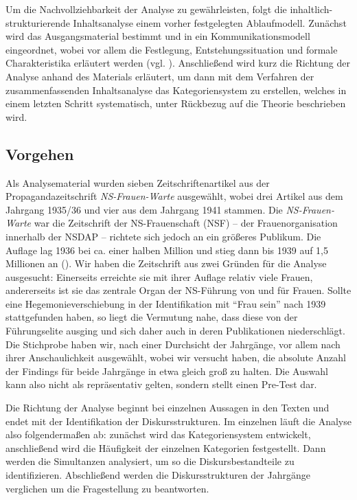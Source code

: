 \documentclass[12pt, titlepage=true, toc=bib]{scrartcl}
\begin{document}
Um die Nachvollziehbarkeit der Analyse zu gewährleisten, folgt die inhaltlich-strukturierende Inhaltsanalyse einem vorher festgelegten Ablaufmodell. Zunächst wird das Ausgangsmaterial bestimmt und in ein Kommunikationsmodell eingeordnet, wobei vor allem die Festlegung, Entstehungssituation und formale Charakteristika erläutert werden (vgl. \cite[52-53]{mayring_qualitative_2010}). Anschließend wird kurz die Richtung der Analyse anhand des Materials erläutert, um dann mit dem Verfahren der zusammenfassenden Inhaltsanalyse das Kategoriensystem zu erstellen, welches in einem letzten Schritt systematisch, unter Rückbezug auf die Theorie beschrieben wird.

\subsection{Vorgehen}

Als Analysematerial wurden sieben Zeitschriftenartikel aus der Propagandazeitschrift \textit{NS-Frauen-Warte} ausgewählt, wobei drei Artikel aus dem Jahrgang 1935/36 und vier aus dem Jahrgang 1941 stammen. Die \textit{NS-Frauen-Warte} war die Zeitschrift der NS-Frauenschaft (NSF) -- der Frauenorganisation innerhalb der NSDAP -- richtete sich jedoch an ein größeres Publikum. Die Auflage lag 1936 bei ca. einer halben Million und stieg dann bis 1939 auf 1,5 Millionen an (\cite[vgl.][89-90]{dohring_von_2004}). Wir haben die Zeitschrift aus zwei Gründen für die Analyse ausgesucht: Einerseits erreichte sie mit ihrer Auflage relativ viele Frauen, andererseits ist sie das zentrale Organ der NS-Führung von und für Frauen. Sollte eine Hegemonieverschiebung in der Identifikation mit "`Frau sein"' nach 1939 stattgefunden haben, so liegt die Vermutung nahe, dass diese von der Führungselite ausging und sich daher auch in deren Publikationen niederschlägt. Die Stichprobe haben wir, nach einer Durchsicht der Jahrgänge, vor allem nach ihrer Anschaulichkeit ausgewählt, wobei wir versucht haben, die absolute Anzahl der Findings für beide Jahrgänge in etwa gleich groß zu halten. Die Auswahl kann also nicht als repräsentativ gelten, sondern stellt einen Pre-Test dar.

Die Richtung der Analyse beginnt bei einzelnen Aussagen in den Texten und endet mit der Identifikation der Diskursstrukturen. Im einzelnen läuft die Analyse also folgendermaßen ab: zunächst wird das Kategoriensystem entwickelt, anschließend wird die Häufigkeit der einzelnen Kategorien festgestellt. Dann werden die Simultanzen analysiert, um so die Diskursbestandteile zu identifizieren. Abschließend werden die Diskursstrukturen der Jahrgänge verglichen um die Fragestellung zu beantworten.
\end{document}
